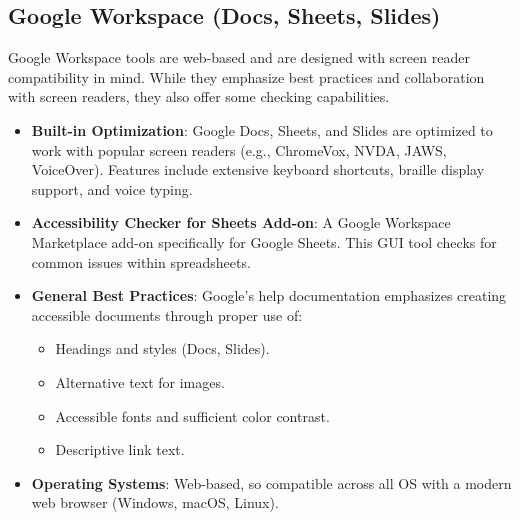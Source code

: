 \subsection{Google Workspace (Docs, Sheets, Slides)}
Google Workspace tools are web-based and are designed with screen reader compatibility in mind. While they emphasize best practices and collaboration with screen readers, they also offer some checking capabilities.
\begin{itemize}
    \item \textbf{Built-in Optimization}: Google Docs, Sheets, and Slides are optimized to work with popular screen readers (e.g., ChromeVox, NVDA, JAWS, VoiceOver). Features include extensive keyboard shortcuts\cite{GoogleShortcuts}, braille display support, and voice typing.
    \item \textbf{Accessibility Checker for Sheets Add-on}\cite{SheetsChecker}: A Google Workspace Marketplace add-on specifically for Google Sheets. This GUI tool checks for common issues within spreadsheets.
    \item \textbf{General Best Practices}: Google's help documentation emphasizes creating accessible documents through proper use of:
        \begin{itemize}
            \item Headings and styles (Docs, Slides).
            \item Alternative text for images\cite{GoogleAltText}.
            \item Accessible fonts and sufficient color contrast.
            \item Descriptive link text.
        \end{itemize}
    \item \textbf{Operating Systems}: Web-based, so compatible across all OS with a modern web browser (Windows, macOS, Linux).
\end{itemize}


